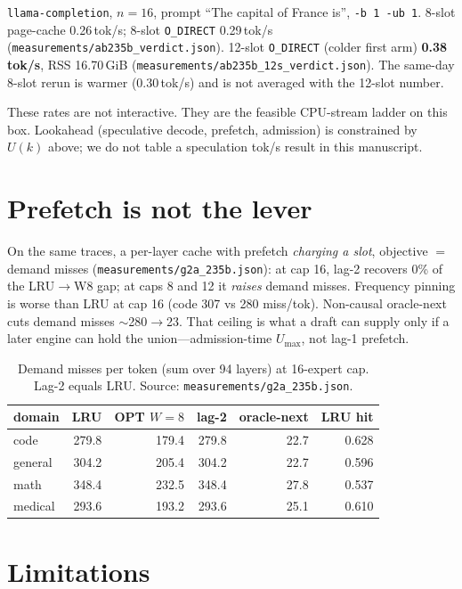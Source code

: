 \documentclass[11pt]{article}
\newcommand{\tps}{tok/s}
\begin{document}
\texttt{llama-completion}, $n{=}16$, prompt ``The capital of France is'',
\texttt{-b 1 -ub 1}. 8-slot page-cache 0.26\,\tps{}; 8-slot \texttt{O\_DIRECT}
0.29\,\tps{} (\texttt{measurements/ab235b\_verdict.json}). 12-slot \texttt{O\_DIRECT}
(colder first arm) \textbf{0.38\,\tps{}}, RSS 16.70\,GiB
(\texttt{measurements/ab235b\_12s\_verdict.json}). The same-day 8-slot rerun is warmer
(0.30\,\tps{}) and is not averaged with the 12-slot number.

These rates are not interactive. They are the feasible CPU-stream ladder on
this box. Lookahead (speculative decode, prefetch, admission) is constrained
by $U(k)$ above; we do not table a speculation tok/s result in this manuscript.

\section{Prefetch is not the lever}
\label{sec:prefetch}

On the same traces, a per-layer cache with prefetch \emph{charging a slot},
objective $=$ demand misses (\texttt{measurements/g2a\_235b.json}): at cap 16, lag-2
recovers 0\% of the LRU$\to$W8 gap; at caps 8 and 12 it \emph{raises} demand
misses. Frequency pinning is worse than LRU at cap 16 (code 307 vs 280
miss/tok). Non-causal oracle-next cuts demand misses $\sim$280$\to$23. That
ceiling is what a draft can supply only if a later engine can hold the
union---admission-time $U_{\max}$, not lag-1 prefetch.

\begin{table}[t]\centering
\caption{Demand misses per token (sum over 94 layers) at 16-expert cap.
Lag-2 equals LRU. Source: \texttt{measurements/g2a\_235b.json}.}
\label{tab:g2a}
\small
\begin{tabular}{lrrrrr}
\toprule
domain & LRU & OPT $W{=}8$ & lag-2 & oracle-next & LRU hit \\
\midrule
code     & 279.8 & 179.4 & 279.8 & 22.7 & 0.628 \\
general  & 304.2 & 205.4 & 304.2 & 22.7 & 0.596 \\
math     & 348.4 & 232.5 & 348.4 & 27.8 & 0.537 \\
medical  & 293.6 & 193.2 & 293.6 & 25.1 & 0.610 \\
\bottomrule
\end{tabular}
\end{table}

\section{Limitations}
\label{sec:lim}
\end{document}
